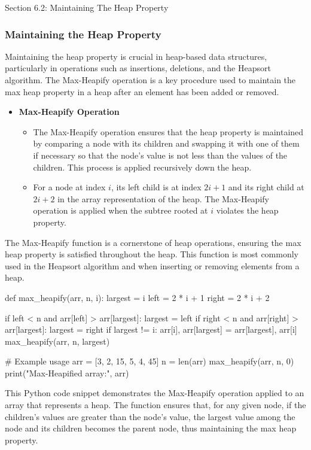 \begin{notes}{Section 6.2: Maintaining The Heap Property}
    \subsubsection*{Maintaining the Heap Property}

    Maintaining the heap property is crucial in heap-based data structures, particularly in operations such as insertions, deletions, and the Heapsort algorithm. The Max-Heapify operation is a key 
    procedure used to maintain the max heap property in a heap after an element has been added or removed.
    
    \begin{itemize}
        \item \textbf{Max-Heapify Operation}
        \begin{itemize}
            \item The Max-Heapify operation ensures that the heap property is maintained by comparing a node with its children and swapping it with one of them if necessary so that the node's value 
            is not less than the values of the children. This process is applied recursively down the heap.
            \item For a node at index $i$, its left child is at index $2i + 1$ and its right child at $2i + 2$ in the array representation of the heap. The Max-Heapify operation is applied when the 
            subtree rooted at $i$ violates the heap property.
        \end{itemize}
    \end{itemize}
    
    \begin{highlight}
        The Max-Heapify function is a cornerstone of heap operations, ensuring the max heap property is satisfied throughout the heap. This function is most commonly used in the Heapsort algorithm 
        and when inserting or removing elements from a heap.
    \begin{code}[Python]
    def max_heapify(arr, n, i):
        largest = i
        left = 2 * i + 1
        right = 2 * i + 2
        
        if left < n and arr[left] > arr[largest]:
            largest = left
        if right < n and arr[right] > arr[largest]:
            largest = right
        if largest != i:
            arr[i], arr[largest] = arr[largest], arr[i]
            max_heapify(arr, n, largest)
    
    # Example usage
    arr = [3, 2, 15, 5, 4, 45]
    n = len(arr)
    max_heapify(arr, n, 0)
    print("Max-Heapified array:", arr)
    \end{code}
        
        This Python code snippet demonstrates the Max-Heapify operation applied to an array that represents a heap. The function ensures that, for any given node, if the children's values are greater 
        than the node's value, the largest value among the node and its children becomes the parent node, thus maintaining the max heap property.
    \end{highlight}
\end{notes}

